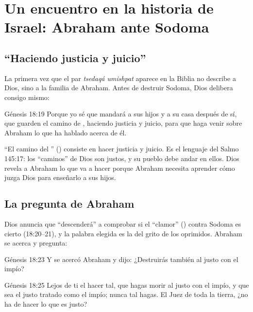 \section{Un encuentro en la historia de Israel: Abraham ante Sodoma}\label{sec:abraham-justo}

\subsection{“Haciendo justicia y juicio”}
La primera vez que el par \emph{tsedaqá umishpat} aparece en la Biblia no describe a Dios, sino a la familia de Abraham. Antes de destruir Sodoma, Dios delibera consigo mismo:

\begin{verso}{Génesis 18:19}
Porque yo sé que mandará a sus hijos y a su casa después de sí, que guarden el camino de \SENOR, haciendo justicia y juicio, para que haga venir \SENOR{} sobre Abraham lo que ha hablado acerca de él.
\end{verso}

``El camino del \SENOR'' () consiste en hacer justicia y juicio. Es el lenguaje del Salmo 145:17: los ``caminos'' de Dios son justos, y su pueblo debe andar en ellos. Dios revela a Abraham lo que va a hacer porque Abraham necesita aprender cómo juzga Dios para enseñarlo a sus hijos.

\subsection{La pregunta de Abraham}
Dios anuncia que ``descenderá'' a comprobar si el ``clamor'' () contra Sodoma es cierto (18:20--21), y la palabra elegida es la del grito de los oprimidos. Abraham se acerca y pregunta:

\begin{verso}{Génesis 18:23}
Y se acercó Abraham y dijo: ¿Destruirás también al justo con el impío?
\end{verso}
\begin{verso}{Génesis 18:25}
Lejos de ti el hacer tal, que hagas morir al justo con el impío, y que sea el justo tratado como el impío; nunca tal hagas. El Juez de toda la tierra, ¿no ha de hacer lo que es justo?
\end{verso}

